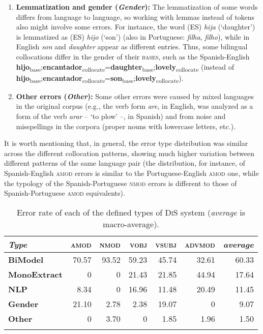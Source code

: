 \documentclass[output=paper
,modfonts
,nonflat]{langsci/langscibook}
\begin{document}
\begin{enumerate}
\item \textbf{Lemmatization and gender (\textit{Gender}):} The lemmatization of some words
  differs from language to language, so working with lemmas instead of
  tokens also might involve some errors. For instance, the word (ES)
  \textit{hija} (`daughter') is lemmatized as (ES) \textit{hijo} (`son')
  (also in Portuguese: \textit{filha}, \textit{filho}), while in English \textit{son}
  and \textit{daughter} appear as different entries. Thus, some bilingual
  collocations differ in the gender of their \textsc{bases}, such as the
  Spanish-English \textbf{hijo}\textsubscript{base};\textbf{encantador}\textsubscript{collocate}=\textbf{daughter}\textsubscript{base};\textbf{lovely}\textsubscript{collocate} (instead of \textbf{hijo}\textsubscript{base};\textbf{encantador}\textsubscript{collocate}=\textbf{son}\textsubscript{base};\textbf{lovely}\textsubscript{collocate}).

\item \textbf{Other errors (\textit{Other}):} Some other errors were caused by mixed languages
  in the original corpus (e.g., the verb form \emph{are}, in English, was analyzed
  as a form of the verb \textit{arar} -- `to plow' --, in Spanish) and from noise
  and misspellings in the corpora (proper nouns with lowercase letters, etc.).
\end{enumerate}

It is worth mentioning that, in general, the error type distribution was similar across
the different collocation patterns, showing much higher variation between different patterns
of the same language pair (the distribution, for instance, of Spanish-English \textsc{amod} errors
is similar to the Portuguese-English \textsc{amod} one, while the typology of the Spanish-Portuguese \textsc{nmod}
errors is different to those of Spanish-Portuguese \textsc{amod} equivalents).

\begin{table}
  \begin{center}
    \caption{\label{tab:error} Error rate of each of the defined types of \textsc{DiS} system (\emph{average} is macro-average).}
    \begin{tabular}{lrrrrrr}
      \lsptoprule
      \textbf{\emph{Type}}&\textbf{\textsc{amod}}&\textbf{\textsc{nmod}}&\textbf{\textsc{vobj}}&\textbf{\textsc{vsubj}}&\textbf{\textsc{advmod}}&\textbf{\emph{average}}\\
      \midrule
      \textbf{BiModel} & 70.57 & 93.52 & 59.23 & 45.74 & 32.61                 & 60.33\\
      \textbf{MonoExtract} & 0\phantom{00} & 0\phantom{00} & 21.43 & 21.85 & 44.94 & 17.64\\
      \textbf{NLP} & 8.34  & 0\phantom{00} & 16.96 & 11.48 & 20.49         & 11.45\\
      \textbf{Gender} & 21.10 & 2.78  & 2.38  & 19.07 & 0\phantom{00}         & 9.07\\
      \textbf{Other} & 0\phantom{00} & 3.70  & 0\phantom{00} & 1.85  & 1.96  & 1.50\\
      \lspbottomrule
    \end{tabular}
  \end{center}
\end{table}
\end{document}
